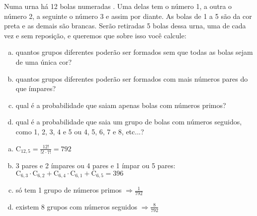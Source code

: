 \begin{ex}
  Numa urna há 12 bolas numeradas . Uma delas tem o número 1, a outra o número 2, a seguinte o número 3 e assim por diante. As bolas de 1 a 5 são da cor preta e as demais são brancas. Serão retiradas 5 bolas dessa urna, uma de cada vez e sem reposição, e queremos que sobre isso você calcule:
    \begin{enumerate}[(a)]
    \item quantos grupos diferentes poderão ser formados sem que todas  as bolas sejam de uma única cor?
    \item quantos grupos diferentes poderão ser formados com mais números pares do que ímpares?
    \item qual é  a probabilidade que saiam apenas bolas com números primos?
    \item qual é a probabilidade que saia um grupo de bolas com números seguidos, como 1, 2, 3, 4 e 5 ou 4, 5, 6, 7 e 8, etc...?
    \end{enumerate}
       \begin{sol}
         \phantom{A}
           \begin{enumerate} [(a)]
               \item $\mathrm{C}_{{12},5}=\frac{12!}{5!\cdot7!}=792$
               \item 3 pares e 2 ímpares ou 4 pares e 1 ímpar ou 5 pares: \\
               $\mathrm{C}_{6,3}\cdot\mathrm{C}_{6,2}+\mathrm{C}_{6,4}\cdot\mathrm{C}_{6,1}+\mathrm{C}_{6,5}=396$
               \item só tem 1 grupo de números primos $\Longrightarrow \frac{1}{792}$
               \item existem 8 grupos com números seguidos $\Longrightarrow \frac{8}{792}$
           \end{enumerate}
       \end{sol}
\end{ex}